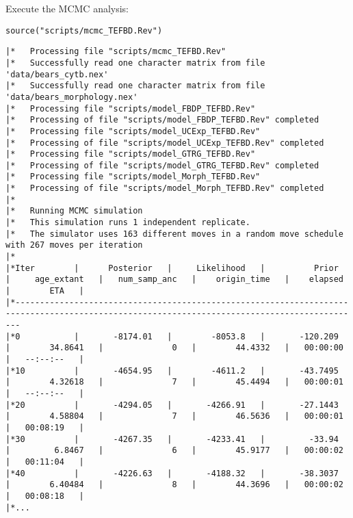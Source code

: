 Execute the MCMC analysis:
{\tt \begin{snugshade*}
\begin{lstlisting}
source("scripts/mcmc_TEFBD.Rev")
\end{lstlisting}
\end{snugshade*}}

{\tiny{\tt \begin{snugshade*}
\begin{lstlisting}
|*   Processing file "scripts/mcmc_TEFBD.Rev"
|*   Successfully read one character matrix from file 'data/bears_cytb.nex'
|*   Successfully read one character matrix from file 'data/bears_morphology.nex'
|*   Processing file "scripts/model_FBDP_TEFBD.Rev"
|*   Processing of file "scripts/model_FBDP_TEFBD.Rev" completed
|*   Processing file "scripts/model_UCExp_TEFBD.Rev"
|*   Processing of file "scripts/model_UCExp_TEFBD.Rev" completed
|*   Processing file "scripts/model_GTRG_TEFBD.Rev"
|*   Processing of file "scripts/model_GTRG_TEFBD.Rev" completed
|*   Processing file "scripts/model_Morph_TEFBD.Rev"
|*   Processing of file "scripts/model_Morph_TEFBD.Rev" completed
|*
|*   Running MCMC simulation
|*   This simulation runs 1 independent replicate.
|*   The simulator uses 163 different moves in a random move schedule with 267 moves per iteration
|*
|*Iter        |      Posterior   |     Likelihood   |          Prior   |     age_extant   |   num_samp_anc   |    origin_time   |    elapsed   |        ETA   |
|*---------------------------------------------------------------------------------------------------------------------------------------------
|*0           |       -8174.01   |        -8053.8   |       -120.209   |        34.8641   |              0   |        44.4332   |   00:00:00   |   --:--:--   |
|*10          |       -4654.95   |        -4611.2   |       -43.7495   |        4.32618   |              7   |        45.4494   |   00:00:01   |   --:--:--   |
|*20          |       -4294.05   |       -4266.91   |       -27.1443   |        4.58804   |              7   |        46.5636   |   00:00:01   |   00:08:19   |
|*30          |       -4267.35   |       -4233.41   |         -33.94   |         6.8467   |              6   |        45.9177   |   00:00:02   |   00:11:04   |
|*40          |       -4226.63   |       -4188.32   |       -38.3037   |        6.40484   |              8   |        44.3696   |   00:00:02   |   00:08:18   |
|*...
\end{lstlisting}
\end{snugshade*}}}

\bigskip
